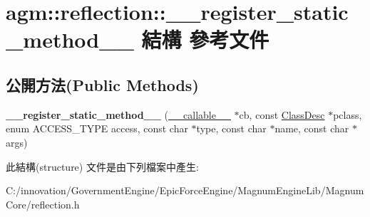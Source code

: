 \hypertarget{structagm_1_1reflection_1_1____register__static__method____}{}\section{agm\+:\+:reflection\+:\+:\+\_\+\+\_\+register\+\_\+static\+\_\+method\+\_\+\+\_\+ 結構 參考文件}
\label{structagm_1_1reflection_1_1____register__static__method____}
\subsection*{公開方法(Public Methods)}
\begin{DoxyCompactItemize}
\item 
{\bfseries \+\_\+\+\_\+register\+\_\+static\+\_\+method\+\_\+\+\_\+} (\hyperlink{structagm_1_1reflection_1_1____callable____}{\+\_\+\+\_\+callable\+\_\+\+\_\+} $\ast$cb, const \hyperlink{classagm_1_1reflection_1_1_class_desc}{Class\+Desc} $\ast$pclass, enum A\+C\+C\+E\+S\+S\+\_\+\+T\+Y\+PE access, const char $\ast$type, const char $\ast$name, const char $\ast$args)\hypertarget{structagm_1_1reflection_1_1____register__static__method_____a0dbfa9fc6bb0a93ece08975dc4afd982}{}\label{structagm_1_1reflection_1_1____register__static__method_____a0dbfa9fc6bb0a93ece08975dc4afd982}

\end{DoxyCompactItemize}


此結構(structure) 文件是由下列檔案中產生\+:\begin{DoxyCompactItemize}
\item 
C\+:/innovation/\+Government\+Engine/\+Epic\+Force\+Engine/\+Magnum\+Engine\+Lib/\+Magnum\+Core/reflection.\+h\end{DoxyCompactItemize}
